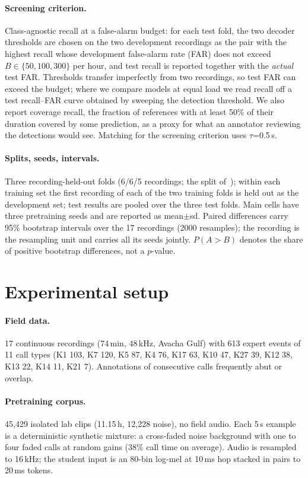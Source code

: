 \documentclass[10pt,twocolumn]{article}
\begin{document}
\paragraph{Screening criterion.} Class-agnostic recall at a false-alarm budget: for each test fold, the two decoder thresholds are chosen on the two development recordings as the pair with the highest recall whose development false-alarm rate (FAR) does not exceed $B\in\{50,100,300\}$ per hour, and test recall is reported together with the \emph{actual} test FAR. Thresholds transfer imperfectly from two recordings, so test FAR can exceed the budget; where we compare models at equal load we read recall off a test recall--FAR curve obtained by sweeping the detection threshold. We also report coverage recall, the fraction of references with at least 50\% of their duration covered by some prediction, as a proxy for what an annotator reviewing the detections would see. Matching for the screening criterion uses $\tau$=0.5\,s.
\paragraph{Splits, seeds, intervals.} Three recording-held-out folds (6/6/5 recordings; the split of~\citep{sheipak2026mmb}); within each training set the first recording of each of the two training folds is held out as the development set; test results are pooled over the three test folds. Main cells have three pretraining seeds and are reported as mean$\pm$sd. Paired differences carry 95\% bootstrap intervals over the 17 recordings (2000 resamples); the recording is the resampling unit and carries all its seeds jointly. $P(A>B)$ denotes the share of positive bootstrap differences, not a $p$-value.

\section{Experimental setup}
\paragraph{Field data.} 17 continuous recordings (74\,min, 48\,kHz, Avacha Gulf) with 613 expert events of 11 call types (K1 103, K7 120, K5 87, K4 76, K17 63, K10 47, K27 39, K12 38, K13 22, K14 11, K21 7). Annotations of consecutive calls frequently abut or overlap.
\paragraph{Pretraining corpus.} 45{,}429 isolated lab clips (11.15\,h, 12{,}228 noise), no field audio. Each 5\,s example is a deterministic synthetic mixture: a cross-faded noise background with one to four faded calls at random gains (38\% call time on average). Audio is resampled to 16\,kHz; the student input is an 80-bin log-mel at 10\,ms hop stacked in pairs to 20\,ms tokens.
\end{document}
